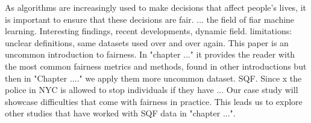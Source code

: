 As algorithms are increasingly used to make decisions that affect people's lives, it is important to ensure that these decisions are fair. 
... the field of fiar machine learning. Interesting findings, recent developments, dynamic field.
limitations: unclear definitions, same datasets used over and over again.
This paper is an uncommon introduction to fairness. In "chapter ..." it provides the reader with the most common fairness metrics and methods, found in other introductions
but then in "Chapter ...." we apply them more uncommon dataset. SQF.
Since x the police in NYC is allowed to stop individuals if they have ...
Our case study will showcase difficulties that come with fairness in practice. This leads us to explore other studies that have worked with SQF data in "chapter ...". 

